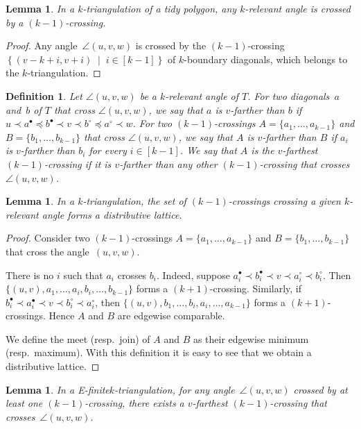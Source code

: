 \documentclass{amsart}
\newtheorem{lemma}[theorem]{Lemma}
\newtheorem{definition}[theorem]{Definition}
\theoremstyle{remark}
\newcommand{\darkblue}{\color{darkblue}} %
\newcommand{\defn}[1]{\textsl{\darkblue #1}} %
\newcommand{\set}[2]{\left\{ #1 \;\middle|\; #2 \right\}} %
\newcommand*{\ef}[0]{E-finite\xspace}
\newcommand*{\ktg}[0]{$k$-triangulation\xspace}
\newcommand{\cl}{\prec}
\newcommand{\cle}{\preccurlyeq}
\begin{document}
\begin{lemma}
\label{lem:tidyExists}
In a \ktg of a tidy polygon, any $k$-relevant angle is crossed by a $(k-1)$-crossing.
\end{lemma}

\begin{proof}
Any angle~$\angle(u,v,w)$ is crossed by the $(k-1)$-crossing~$\set{(v-k+i, v+i)}{i \in [k-1]}$ of $k$-boundary diagonals, which belongs to the \ktg.
\end{proof}

\begin{definition}
Let $\angle(u,v,w)$ be a $k$-relevant angle of $T$.
For two diagonals~$a$ and~$b$ of $T$ that cross $\angle(u,v,w)$, we say that $a$ is \defn{$v$-farther} than $b$ if $u \cl a^\bullet \cle b^\bullet \cl v \cl b^\circ \cle a^\circ \cl w$. For two $(k-1)$-crossings $A = \{a_1, \dots, a_{k-1}\}$ and $B = \{b_1, \dots, b_{k-1}\}$ that cross $\angle(u,v,w)$, we say that $A$ is \defn{$v$-farther} than $B$ if $a_i$ is $v$-farther than $b_i$ for every $i \in [k-1]$. We say that $A$ is the \defn{$v$-farthest} $(k-1)$-crossing if it is $v$-farther than any other $(k-1)$-crossing that crosses~$\angle(u,v,w)$.
\end{definition}

\begin{lemma}
In a \ktg, the set of $(k-1)$-crossings crossing a given $k$-relevant angle forms a distributive lattice.
\end{lemma}

\begin{proof}
Consider two $(k-1)$-crossings $A = \{a_1, \dots, a_{k-1}\}$ and $B = \{b_1, \dots, b_{k-1}\}$ that cross the angle~$(u,v,w)$.

There is no $i$ such that $a_i$ crosses $b_i$. 
Indeed, suppose $a^\bullet_i \cl b^\bullet_i \cl v \cl a^\circ_i \cl b^\circ_i$. Then $\{(u, v), a_1, \dots, a_i, b_i, \dots, b_{k-1}\}$ forms a $(k+1)$-crossing. 
Similarly, if $b^\bullet_i \cl a^\bullet_i \cl v \cl b^\circ_i \cl a^\circ_i$, then $\{(u, v), b_1, \dots, b_i, a_i, \dots, a_{k-1}\}$ forms a $(k+1)$-crossings.
Hence $A$ and $B$ are edgewise comparable.

We define the meet (resp.~join) of $A$ and $B$ as their edgewise minimum (resp.~maximum). With this definition it is easy to see that we obtain a distributive lattice.
\end{proof}

\begin{lemma}
\label{lem:efMax}
In a \ef \ktg, for any angle~$\angle(u,v,w)$ crossed by at least one $(k-1)$-crossing, there exists a $v$-farthest $(k-1)$-crossing that crosses~$\angle(u,v,w)$.
\end{lemma}
\end{document}
